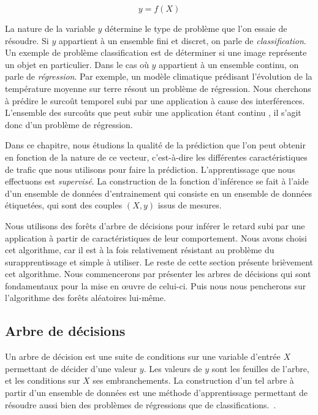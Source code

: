 $$y = f(X)$$

La nature de la variable $y$ détermine le type de problème que l'on essaie de résoudre. 
Si $y$ appartient à un ensemble fini et discret, on parle de \emph{classification}.
Un exemple de problème classification est de déterminer si une image représente un objet en particulier.
Dans le cas où $y$ appartient à un ensemble continu, on parle de \emph{régression}.
Par exemple, un modèle climatique prédisant l'évolution de la température moyenne sur terre résout un problème de régression.
Nous cherchons à prédire le surcoût temporel subi par une application à cause des interférences.
L'ensemble des surcoûts que peut subir une application étant continu
, il s'agit donc d'un problème de régression.


Dans ce chapitre, nous étudions la qualité de la prédiction que l'on peut obtenir en fonction de la nature de ce vecteur, c'est-à-dire les différentes caractéristiques de trafic que nous utilisons pour faire la prédiction. L'apprentissage que nous effectuons est \emph{supervisé}.
La construction de la fonction d'inférence se fait à l'aide d'un ensemble de données d'entrainement qui consiste en un ensemble de données étiquetées, qui sont des couples $(X, y)$ issus de mesures.

Nous utilisons des forêts d'arbre de décisions pour inférer le retard subi par une application à partir de caractéristiques de leur comportement.
Nous avons choisi cet algorithme, car il est à la fois relativement résistant au problème du surapprentissage et simple à utiliser.
Le reste de cette section présente brièvement cet algorithme.
Nous commencerons par présenter les arbres de décisions qui sont fondamentaux pour la mise en œuvre de celui-ci.
Puis nous nous pencherons sur l'algorithme des forêts aléatoires lui-même.

\subsection{\label{section:inference:reg:decision-tree}Arbre de décisions}

Un arbre de décision est une suite de conditions sur une variable d'entrée $X$ permettant de décider d'une valeur $y$.
Les valeurs de $y$ sont les feuilles de l'arbre, et les conditions sur $X$ ses embranchements.
La construction d'un tel arbre à partir d'un ensemble de données est une méthode d'apprentissage permettant de résoudre aussi bien des problèmes de régressions que de classifications.~\cite{breiman2017classification}.

